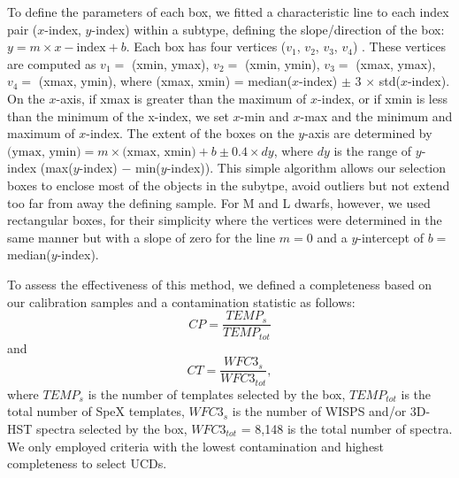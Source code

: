 \documentclass[manuscript]{aastex63}
\begin{document}
To define the parameters of each box, we fitted a characteristic line to each index pair ($x$-index, $y$-index) within a subtype, defining the slope/direction of the box: $y=m\times x-\mathrm{index}+b$. Each box has four vertices ($v_1$, $v_2$, $v_3$, $v_4$) . These vertices are computed as $v_1=$  (xmin, ymax), $v_2=$ (xmin, ymin), $v_3=$ (xmax, ymax), $v_4=$ (xmax, ymin), where (xmax, xmin) =  median($x$-index) $\pm$ 3 $\times$ std($x$-index). On the $x$-axis, if xmax is greater than the maximum of $x$-index, or if xmin is less than the minimum of the x-index, we set $x$-min and $x$-max and the minimum and maximum of $x$-index. The extent of the boxes on the $y$-axis are determined by $\text{(ymax, ymin)}= m \times \text{(xmax, xmin)} + b \pm 0.4 \times dy$, where $dy$ is the range of $y$-index (max($y$-index) $-$ min($y$-index)). This simple algorithm allows our selection boxes to enclose most of the objects in the subytpe, avoid outliers but not extend too far from away the defining sample. For M and L dwarfs, however, we used rectangular boxes, for their simplicity where the vertices were determined in the same manner but with a slope of zero for the line $m=0$ and a $y$-intercept of $b=  $ median($y$-index). 

To assess the effectiveness of this method, we defined a completeness based on our calibration samples and a contamination statistic as follows: 
 \begin{equation} CP=\frac{TEMP_s}{TEMP_{tot}} \end{equation}
 and
\begin{equation} CT= \frac{WFC3_s}{WFC3_{tot}}, \end{equation} 
where $TEMP_s$ is the number of templates selected by the box, $TEMP_{tot}$ is the total number of SpeX templates, $WFC3_s$ is the number of WISPS and/or 3D-HST spectra selected by the box, $WFC3_{tot}$ = 8,148 is the total number of spectra. We only employed criteria with the lowest contamination and highest completeness to select UCDs. 
\end{document}
